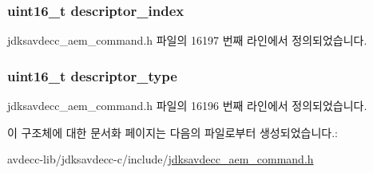 \subsubsection[{\texorpdfstring{descriptor\+\_\+index}{descriptor_index}}]{\setlength{\rightskip}{0pt plus 5cm}uint16\+\_\+t descriptor\+\_\+index}\hypertarget{structjdksavdecc__aem__command__get__clock__source_a042bbc76d835b82d27c1932431ee38d4}{}\label{structjdksavdecc__aem__command__get__clock__source_a042bbc76d835b82d27c1932431ee38d4}


jdksavdecc\+\_\+aem\+\_\+command.\+h 파일의 16197 번째 라인에서 정의되었습니다.

\subsubsection[{\texorpdfstring{descriptor\+\_\+type}{descriptor_type}}]{\setlength{\rightskip}{0pt plus 5cm}uint16\+\_\+t descriptor\+\_\+type}\hypertarget{structjdksavdecc__aem__command__get__clock__source_ab7c32b6c7131c13d4ea3b7ee2f09b78d}{}\label{structjdksavdecc__aem__command__get__clock__source_ab7c32b6c7131c13d4ea3b7ee2f09b78d}


jdksavdecc\+\_\+aem\+\_\+command.\+h 파일의 16196 번째 라인에서 정의되었습니다.



이 구조체에 대한 문서화 페이지는 다음의 파일로부터 생성되었습니다.\+:\begin{DoxyCompactItemize}
\item 
avdecc-\/lib/jdksavdecc-\/c/include/\hyperlink{jdksavdecc__aem__command_8h}{jdksavdecc\+\_\+aem\+\_\+command.\+h}\end{DoxyCompactItemize}
